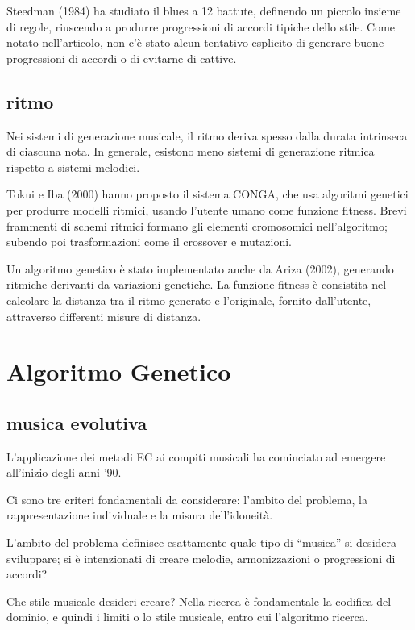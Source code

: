 \documentclass[a4paper,12pt]{report}
\begin{document}
Steedman (1984) ha studiato il blues a 12 battute, definendo un piccolo insieme di regole, riuscendo a produrre progressioni di accordi tipiche dello stile.
Come notato nell'articolo, non c'è stato alcun tentativo esplicito di generare buone progressioni di accordi o di evitarne di cattive. 

\subsection{ritmo}

Nei sistemi di generazione musicale, il ritmo deriva spesso dalla durata intrinseca di ciascuna nota. 
In generale, esistono meno sistemi di generazione ritmica rispetto a sistemi melodici.

Tokui e Iba (2000) hanno proposto il sistema CONGA, che usa algoritmi genetici per produrre modelli ritmici, usando l'utente umano come funzione fitness.
Brevi frammenti di schemi ritmici formano gli elementi cromosomici nell'algoritmo; subendo poi trasformazioni come il crossover e mutazioni. 

Un algoritmo genetico è stato implementato anche da Ariza (2002), generando ritmiche derivanti da variazioni genetiche.
La funzione fitness è consistita nel calcolare la distanza tra il ritmo generato e l'originale, fornito dall'utente, attraverso differenti misure di distanza. 

\section{Algoritmo Genetico}

\subsection{musica evolutiva}

L'applicazione dei metodi EC ai compiti musicali ha cominciato ad emergere all'inizio degli anni '90.

Ci sono tre criteri fondamentali da considerare: l'ambito del problema, la rappresentazione individuale e la misura dell'idoneità. 

L’ambito del problema definisce esattamente quale tipo di “musica” si desidera sviluppare; si è intenzionati di creare melodie, armonizzazioni o progressioni di accordi? 

Che stile musicale desideri creare? 
Nella ricerca è fondamentale la codifica del dominio, e quindi i limiti o lo stile musicale, entro cui l'algoritmo ricerca. 
\end{document}
